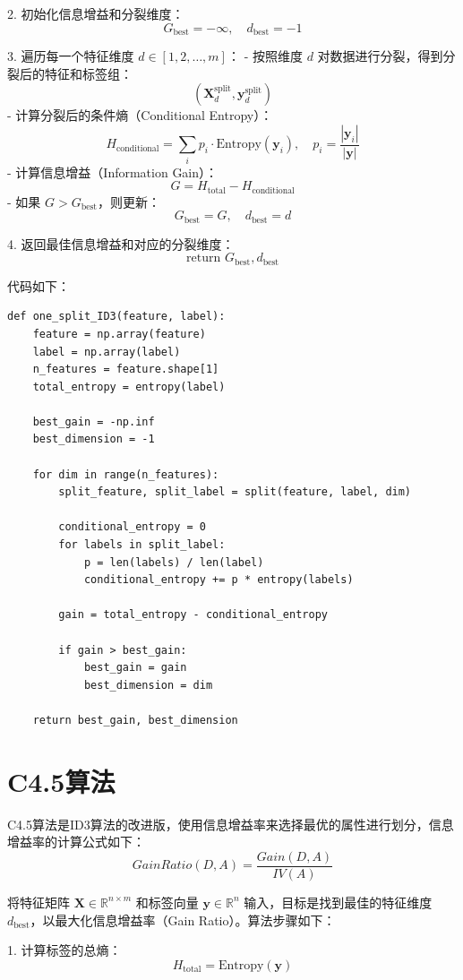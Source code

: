 \documentclass[12pt,a4paper,oneside]{article}
\begin{document}
2. 初始化信息增益和分裂维度：
   \[
   G_{\text{best}} = -\infty, \quad d_{\text{best}} = -1
   \]

3. 遍历每一个特征维度 $d \in [1, 2, \ldots, m]$：
   - 按照维度 $d$ 对数据进行分裂，得到分裂后的特征和标签组：
     \[
     (\mathbf{X}_d^{\text{split}}, \mathbf{y}_d^{\text{split}})
     \]
   - 计算分裂后的条件熵（Conditional Entropy）：
     \[
     H_{\text{conditional}} = \sum_{i} p_i \cdot \text{Entropy}(\mathbf{y}_i), \quad p_i = \frac{|\mathbf{y}_i|}{|\mathbf{y}|}
     \]
   - 计算信息增益（Information Gain）：
     \[
     G = H_{\text{total}} - H_{\text{conditional}}
     \]
   - 如果 $G > G_{\text{best}}$，则更新：
     \[
     G_{\text{best}} = G, \quad d_{\text{best}} = d
     \]

4. 返回最佳信息增益和对应的分裂维度：
   \[
   \text{return } G_{\text{best}}, d_{\text{best}}
   \]

代码如下：
\begin{lstlisting}
def one_split_ID3(feature, label):
    feature = np.array(feature)
    label = np.array(label)
    n_features = feature.shape[1]
    total_entropy = entropy(label)
    
    best_gain = -np.inf
    best_dimension = -1

    for dim in range(n_features):
        split_feature, split_label = split(feature, label, dim)
        
        conditional_entropy = 0
        for labels in split_label:
            p = len(labels) / len(label)
            conditional_entropy += p * entropy(labels)
        
        gain = total_entropy - conditional_entropy
        
        if gain > best_gain:
            best_gain = gain
            best_dimension = dim

    return best_gain, best_dimension
\end{lstlisting}
\section{C4.5算法}
\qquad C4.5算法是ID3算法的改进版，使用信息增益率来选择最优的属性进行划分，信息增益率的计算公式如下：
$$GainRatio(D,A)=\frac{Gain(D,A)}{IV(A)}$$

将特征矩阵 $\mathbf{X} \in \mathbb{R}^{n \times m}$ 和标签向量 $\mathbf{y} \in \mathbb{R}^{n}$ 输入，目标是找到最佳的特征维度 $d_{\text{best}}$，以最大化信息增益率（Gain Ratio）。算法步骤如下：

1. 计算标签的总熵：
   \[
   H_{\text{total}} = \text{Entropy}(\mathbf{y})
   \]
\end{document}

